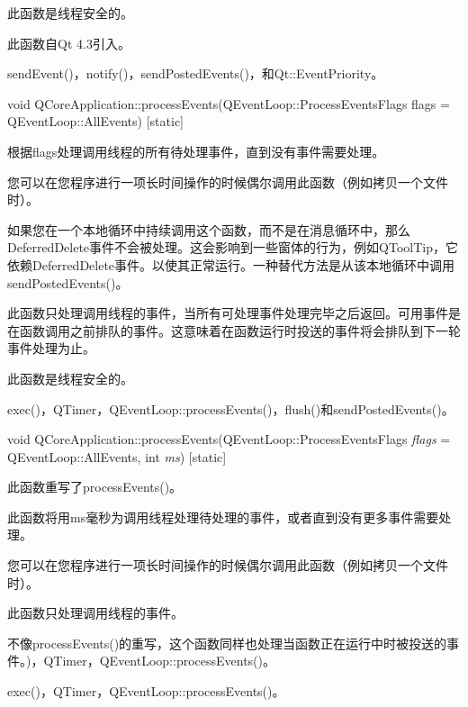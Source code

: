 \begin{notice}
此函数是线程安全的。
\end{notice}


此函数自Qt 4.3引入。

\begin{seeAlso}
sendEvent()，notify()，sendPostedEvents()，和Qt::EventPriority。
\end{seeAlso}

void QCoreApplication::processEvents(QEventLoop::ProcessEventsFlags flags = QEventLoop::AllEvents) [static]

根据flags处理调用线程的所有待处理事件，直到没有事件需要处理。

您可以在您程序进行一项长时间操作的时候偶尔调用此函数（例如拷贝一个文件时）。

如果您在一个本地循环中持续调用这个函数，而不是在消息循环中，那么DeferredDelete事件不会被处理。这会影响到一些窗体的行为，例如QToolTip，它依赖DeferredDelete事件。以使其正常运行。一种替代方法是从该本地循环中调用sendPostedEvents()。

此函数只处理调用线程的事件，当所有可处理事件处理完毕之后返回。可用事件是在函数调用之前排队的事件。这意味着在函数运行时投送的事件将会排队到下一轮事件处理为止。


\begin{notice}
此函数是线程安全的。
\end{notice}

\begin{seeAlso}
exec()，QTimer，QEventLoop::processEvents()，flush()和sendPostedEvents()。
\end{seeAlso}

void QCoreApplication::processEvents(QEventLoop::ProcessEventsFlags
\emph{flags} = QEventLoop::AllEvents, int \emph{ms}) [static]

此函数重写了processEvents()。

此函数将用ms毫秒为调用线程处理待处理的事件，或者直到没有更多事件需要处理。

您可以在您程序进行一项长时间操作的时候偶尔调用此函数（例如拷贝一个文件时）。

此函数只处理调用线程的事件。


\begin{notice}
不像processEvents()的重写，这个函数同样也处理当函数正在运行中时被投送的事件。)，QTimer，QEventLoop::processEvents()。
\end{notice}

\begin{seeAlso}
exec()，QTimer，QEventLoop::processEvents()。
\end{seeAlso}

